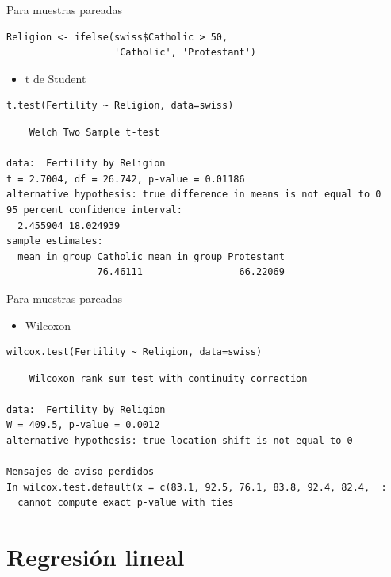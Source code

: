 \documentclass[xcolor={usenames,svgnames,dvipsnames}]{beamer}
\begin{document}
\begin{frame}[fragile,label=sec-4-2]{Para muestras pareadas}
 \lstset{language=R,label= ,caption= ,numbers=none}
\begin{lstlisting}
Religion <- ifelse(swiss$Catholic > 50,
                   'Catholic', 'Protestant')
\end{lstlisting}

\begin{itemize}
\item t de Student
\end{itemize}
\lstset{language=R,label= ,caption= ,numbers=none}
\begin{lstlisting}
t.test(Fertility ~ Religion, data=swiss)
\end{lstlisting}

\begin{verbatim}
	Welch Two Sample t-test

data:  Fertility by Religion
t = 2.7004, df = 26.742, p-value = 0.01186
alternative hypothesis: true difference in means is not equal to 0
95 percent confidence interval:
  2.455904 18.024939
sample estimates:
  mean in group Catholic mean in group Protestant 
                76.46111                 66.22069
\end{verbatim}
\end{frame}

\begin{frame}[fragile,label=sec-4-3]{Para muestras pareadas}
 \begin{itemize}
\item Wilcoxon
\end{itemize}
\lstset{language=R,label= ,caption= ,numbers=none}
\begin{lstlisting}
wilcox.test(Fertility ~ Religion, data=swiss)
\end{lstlisting}

\begin{verbatim}
	Wilcoxon rank sum test with continuity correction

data:  Fertility by Religion
W = 409.5, p-value = 0.0012
alternative hypothesis: true location shift is not equal to 0

Mensajes de aviso perdidos
In wilcox.test.default(x = c(83.1, 92.5, 76.1, 83.8, 92.4, 82.4,  :
  cannot compute exact p-value with ties
\end{verbatim}
\end{frame}

\section{Regresión lineal}
\label{sec-5}
\end{document}
